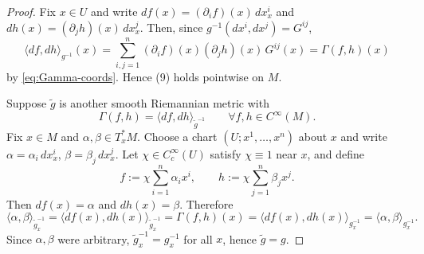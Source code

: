 \documentclass[10pt,a4paper]{amsart}
\begin{document}
\begin{proof}
Fix $x\in U$ and write $df(x)=(\partial_i f)(x)\,dx^i_x$ and $dh(x)=(\partial_j h)(x)\,dx^j_x$.
Then, since $g^{-1}(dx^i,dx^j)=G^{ij}$,
\[
\langle df,dh\rangle_{g^{-1}}(x)
=\sum_{i,j=1}^n (\partial_i f)(x)(\partial_j h)(x)\,G^{ij}(x)
=\Gamma(f,h)(x)
\]
by \eqref{eq:Gamma-coords}. Hence (9) holds pointwise on $M$.

Suppose $\tilde g$ is another smooth Riemannian metric with
\[
\Gamma(f,h)=\langle df,dh\rangle_{\tilde g^{-1}}
\qquad\forall f,h\in C^\infty(M).
\]
Fix $x\in M$ and $\alpha,\beta\in T_x^*M$. Choose a chart $(U;x^1,\dots,x^n)$ about $x$ and write
$\alpha=\alpha_i\,dx^i_x$, $\beta=\beta_j\,dx^j_x$. Let $\chi\in C_c^\infty(U)$ satisfy $\chi\equiv 1$
near $x$, and define
\[
f:=\chi\sum_{i=1}^n \alpha_i x^i,\qquad h:=\chi\sum_{j=1}^n \beta_j x^j.
\]
Then $df(x)=\alpha$ and $dh(x)=\beta$. Therefore
\[
\langle \alpha,\beta\rangle_{\tilde g^{-1}_x}
=\langle df(x),dh(x)\rangle_{\tilde g^{-1}_x}
=\Gamma(f,h)(x)
=\langle df(x),dh(x)\rangle_{g^{-1}_x}
=\langle \alpha,\beta\rangle_{g^{-1}_x}.
\]
Since $\alpha,\beta$ were arbitrary, $\tilde g^{-1}_x=g^{-1}_x$ for all $x$, hence $\tilde g=g$.
\end{proof}
\end{document}
